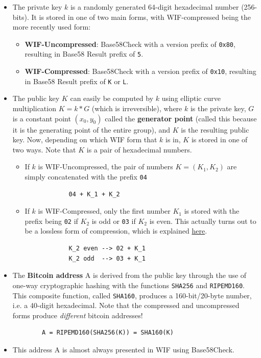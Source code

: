 \documentclass{article}
\begin{document}
  \begin{itemize}
    \item The private key $k$ is a randomly generated 64-digit hexadecimal number (256-bits). It is stored in one of two main forms, with WIF-compressed being the more recently used form:
      \begin{itemize}
        \item \textbf{WIF-Uncompressed}: Base58Check with a version prefix of \texttt{0x80}, resulting in Base58 Result prefix of \texttt{5}.
        \item \textbf{WIF-Compressed}: Base58Check with a version prefix of \texttt{0x10}, resulting in Base58 Result prefix of \texttt{K} or \texttt{L}.
      \end{itemize}
    \item The public key $K$ can easily be computed by $k$ using elliptic curve multiplication $K = k * G$ (which is irreversible), where $k$ is the private key, $G$ is a constant point $(x_0, y_0)$ called the \textbf{generator point} (called this because it is the generating point of the entire group), and $K$ is the resulting public key. Now, depending on which WIF form that $k$ is in, $K$ is stored in one of two ways. Note that $K$ is a pair of hexadecimal numbers.
      \begin{itemize}
        \item If $k$ is WIF-Uncompressed, the pair of numbers $K=(K_1,K_2)$ are simply concatenated with the prefix \texttt{04}
          \begin{lstlisting}
            04 + K_1 + K_2
          \end{lstlisting}
        \item If $k$ is WIF-Compressed, only the first number $K_1$ is stored with the prefix being \texttt{02} if $K_2$ is odd or \texttt{03} if $K_2$ is even. This actually turns out to be a lossless form of compression, which is explained \href{Public_Key_Compression.html}{here}.
          \begin{lstlisting}
            K_2 even --> 02 + K_1
            K_2 odd  --> 03 + K_1
          \end{lstlisting}
      \end{itemize}
    \item The \textbf{Bitcoin address} A is derived from the public key through the use of one-way cryptographic hashing with the functions \texttt{SHA256} and \texttt{RIPEMD160}. This composite function, called \texttt{SHA160}, produces a 160-bit/20-byte number, i.e. a 40-digit hexadecimal. Note that the compressed and uncompressed forms produce \textit{different} bitcoin addresses!
      \begin{lstlisting}
        A = RIPEMD160(SHA256(K)) = SHA160(K)
      \end{lstlisting}
    \item This address A is almost always presented in WIF using Base58Check.
  \end{itemize}
\end{document}
